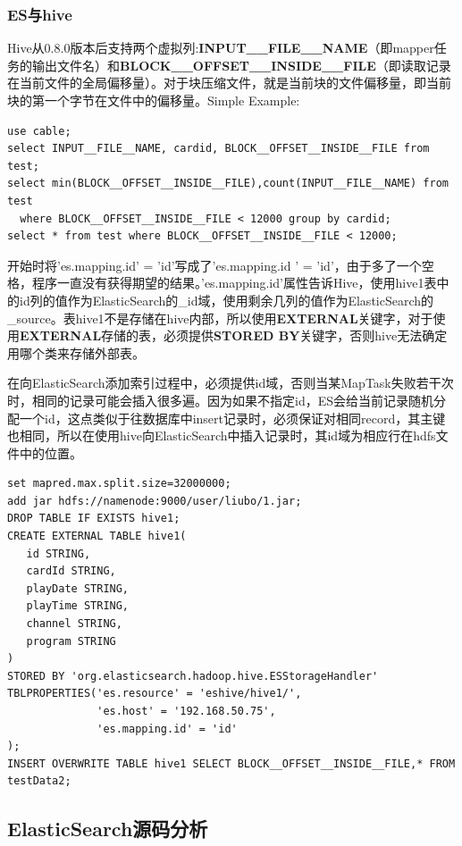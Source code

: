 \subsubsection{ES与hive}
\par Hive从0.8.0版本后支持两个虚拟列:\textbf{INPUT\_\_FILE\_\_NAME}（即mapper任务的输出文件名）和\textbf{BLOCK\_\_OFFSET\_\_INSIDE\_\_FILE}（即读取记录在当前文件的全局偏移量）。对于块压缩文件，就是当前块的文件偏移量，即当前块的第一个字节在文件中的偏移量。Simple Example:
\begin{verbatim}
use cable;
select INPUT__FILE__NAME, cardid, BLOCK__OFFSET__INSIDE__FILE from test;
select min(BLOCK__OFFSET__INSIDE__FILE),count(INPUT__FILE__NAME) from test
  where BLOCK__OFFSET__INSIDE__FILE < 12000 group by cardid;
select * from test where BLOCK__OFFSET__INSIDE__FILE < 12000;
\end{verbatim}
\par 开始时将'es.mapping.id' = 'id'写成了'es.mapping.id ' = 'id'，由于多了一个空格，程序一直没有获得期望的结果。'es.mapping.id'属性告诉Hive，使用hive1表中的id列的值作为ElasticSearch的\_id域，使用剩余几列的值作为ElasticSearch的\_source。表hive1不是存储在hive内部，所以使用\textbf{EXTERNAL}关键字，对于使用\textbf{EXTERNAL}存储的表，必须提供\textbf{STORED BY}关键字，否则hive无法确定用哪个类来存储外部表。
\par 在向ElasticSearch添加索引过程中，必须提供id域，否则当某MapTask失败若干次时，相同的记录可能会插入很多遍。因为如果不指定id，ES会给当前记录随机分配一个id，这点类似于往数据库中insert记录时，必须保证对相同record，其主键也相同，所以在使用hive向ElasticSearch中插入记录时，其id域为相应行在hdfs文件中的位置。
\begin{verbatim}
set mapred.max.split.size=32000000;
add jar hdfs://namenode:9000/user/liubo/1.jar;
DROP TABLE IF EXISTS hive1;
CREATE EXTERNAL TABLE hive1(
   id STRING,
   cardId STRING, 
   playDate STRING, 
   playTime STRING,
   channel STRING, 
   program STRING
)
STORED BY 'org.elasticsearch.hadoop.hive.ESStorageHandler'
TBLPROPERTIES('es.resource' = 'eshive/hive1/',
              'es.host' = '192.168.50.75',
              'es.mapping.id' = 'id'
);
INSERT OVERWRITE TABLE hive1 SELECT BLOCK__OFFSET__INSIDE__FILE,* FROM testData2;
\end{verbatim}
\subsection{ElasticSearch源码分析}
